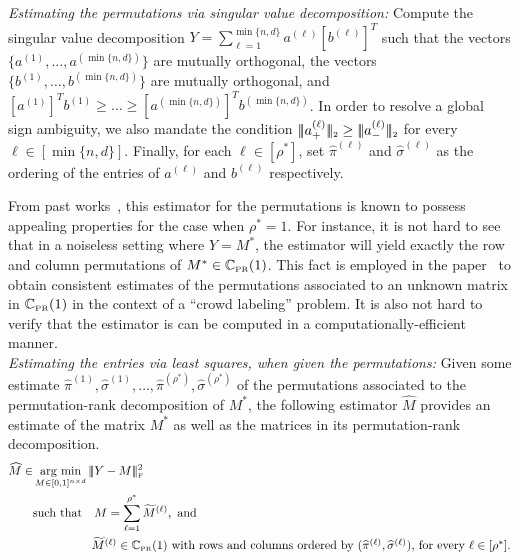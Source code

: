 \documentclass[11pt, hidelinks]{article} %
\newcommand{\matsnorm}[2]{|\!|\!| #1 | \! | \!|_{{#2}}}
\newcommand{\frobnorm}[1]{\ensuremath{\matsnorm{#1}{\mbox{\tiny{F}}}}}
\newcommand{\Lnorm}[2]{\ensuremath{\matsnorm{#1}{\mbox{\tiny{#2}}}}}
\newcommand{\argmin}{\operatornamewithlimits{arg~min}}
\newcommand{\numrows}{n}
\newcommand{\numcols}{d}
\newcommand{\wtmatrix}{M}
\newcommand{\wtstar}{\wtmatrix^*}
\newcommand{\matrixset}{\mathbb{C}}
\newcommand{\wthat}{\widehat{\wtmatrix}}
\newcommand{\permset}{\matrixset_{\mbox{\tiny PR}}}
\newcommand{\permone}{\permset(1)}
\newcommand{\obs}{\ensuremath{Y}}
\newcommand{\permrank}{\rho}
\newcommand{\leftvec}{a}
\newcommand{\rightvec}{b}
\newcommand{\permstar}{\permrank^*}
\newcommand{\sig}{\sigma}
\begin{document}
\emph{Estimating the permutations via singular value decomposition:} Compute the singular value
decomposition $\obs = \sum_{\ell=1}^{\min\{\numrows,\numcols\}}
\leftvec^{(\ell)} [\rightvec^{(\ell)}]^T$  such that the vectors $\{\leftvec^{(1)},\ldots,\leftvec^{(\min\{\numrows,\numcols\})}\}$ are mutually orthogonal, the vectors $\{\rightvec^{(1)},\ldots,\rightvec^{(\min\{\numrows,\numcols\})}\}$ are mutually orthogonal, and $[\leftvec^{(1)}]^T \rightvec^{(1)} \geq \ldots \geq [\leftvec^{(\min\{\numrows,\numcols\})}]^T \rightvec^{(\min\{\numrows,\numcols\})}$. In order to resolve a global sign ambiguity, we also mandate the condition $\Lnorm{\leftvec^{(\ell)}_+}{2} \geq \Lnorm{\leftvec^{(\ell)}_-}{2}$ for every $\ell \in [\min\{\numrows,\numcols\}]$.  Finally, for each $\ell \in
[\permstar]$, set $\widehat{\pi}^{(\ell)}$ and
$\widehat{\sigma}^{(\ell)}$ as the ordering of
the entries of $\leftvec^{(\ell)}$ and $\rightvec^{(\ell)}$ respectively.

From past works~\cite{shah2016permutation}, this estimator for the permutations is known to possess appealing properties for the case when $\permstar= 1$. For instance, it is not hard to see that in a noiseless setting where $\obs = \wtstar$, the estimator will yield exactly the row and column permutations of $\wtstar \in \permone$. This fact
is employed in the paper~\cite{shah2016permutation} to obtain
consistent estimates of the permutations associated to an unknown matrix in $\permone$ in the context of a ``crowd labeling'' problem. It is also not hard to verify that the estimator is can be computed in a computationally-efficient manner. %
\\

\emph{Estimating the entries via least squares, when given the permutations:} Given some estimate $\widehat{\pi}^{(1)},\widehat{\sig}^{(1)},\ldots,\widehat{\pi}^{(\permstar)},\widehat{\sig}^{(\permstar)}$ of the permutations associated to the permutation-rank decomposition of $\wtstar$, the following estimator $\wthat$ provides an estimate of the matrix $\wtstar$ as well as the matrices in its permutation-rank decomposition. 
\begin{align}
\wthat \in & \argmin_{\wtmatrix \in [0,1]^{\numrows \times \numcols} } \frobnorm{ \obs -
  \wtmatrix}^2 \label{EqnLSEDoesntWork} \\ & \mbox{such that}\quad
\wtmatrix = \sum_{\ell=1}^{\permstar} \widetilde{\wtmatrix}^{(\ell)}, \text{ and}
\nonumber \\
%
& \phantom{such that}\quad \mbox{$\widetilde{\wtmatrix}^{(\ell)} \in
  \permone$ with rows and columns ordered by $(\widehat{\pi}^{(\ell)},
  \widehat{\sigma}^{(\ell)})$, for every $\ell \in
          [\permstar]$}. \nonumber
\end{align} 
\end{document}
